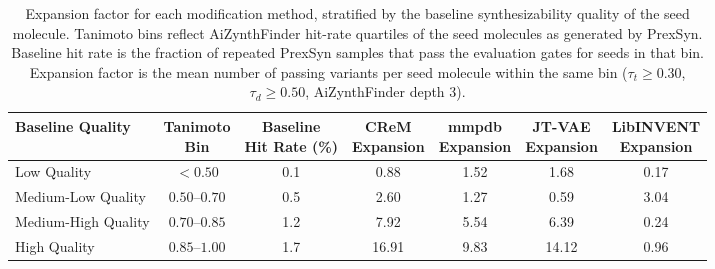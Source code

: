 \begin{table}[ht]
\centering
\caption{Expansion factor for each modification method, stratified by the
baseline synthesizability quality of the seed molecule. Tanimoto bins reflect
AiZynthFinder hit-rate quartiles of the seed molecules as generated by
PrexSyn. Baseline hit rate is the fraction of repeated PrexSyn samples that
pass the evaluation gates for seeds in that bin. Expansion factor is the
mean number of passing variants per seed molecule within the same bin
($\tau_t \geq 0.30$, $\tau_d \geq 0.50$, AiZynthFinder depth 3).}
\label{tab:expansion-stratified}
\begin{tabular}{lcccccc}
\toprule
Baseline Quality & \makecell{Tanimoto \\ Bin}
  & \makecell{Baseline \\ Hit Rate (\%)}
  & \makecell{CReM \\ Expansion}
  & \makecell{mmpdb \\ Expansion}
  & \makecell{JT-VAE \\ Expansion}
  & \makecell{LibINVENT \\ Expansion} \\
\midrule
Low Quality         & $< 0.50$        & 0.1 &  0.88 &  1.52 &  1.68 & 0.17 \\
Medium-Low Quality  & $0.50$--$0.70$  & 0.5 &  2.60 &  1.27 &  0.59 & 3.04 \\
Medium-High Quality & $0.70$--$0.85$  & 1.2 &  7.92 &  5.54 &  6.39 & 0.24 \\
High Quality        & $0.85$--$1.00$  & 1.7 & 16.91 &  9.83 & 14.12 & 0.96 \\
\bottomrule
\end{tabular}
\end{table}

